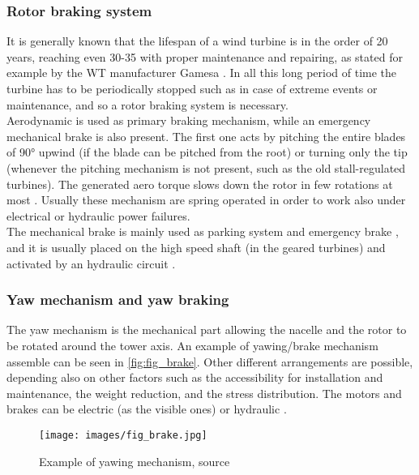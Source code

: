 \subsubsection{Rotor braking system}
It is generally known that the lifespan of a wind turbine is in the order of 20 years, reaching even 30-35 with proper maintenance and repairing, as stated for example by the WT manufacturer Gamesa \cite{gamesa_life_turbine}. In all this long period of time the turbine has to be periodically stopped such as in case of extreme events or maintenance, and so a rotor braking system is necessary.\\
Aerodynamic is used as primary braking mechanism, while an emergency mechanical brake is also present. The first one acts by pitching the entire blades of 90$\si{\degree}$ upwind (if the blade can be pitched from the root) or turning only the tip (whenever the pitching mechanism is not present, such as the old stall-regulated turbines). The generated aero torque slows down the rotor in few rotations at most \cite{brake_dromstorre}. Usually these mechanism are spring operated in order to work also under electrical or hydraulic power failures.\\
The mechanical brake is mainly used as parking system and emergency brake \cite{brake_dromstorre}, and it is usually placed on the high speed shaft (in the geared turbines) and activated by an hydraulic circuit \cite{brake_wiley}. 

\subsubsection{Yaw mechanism and yaw braking}
The yaw mechanism is the mechanical part allowing the nacelle and the rotor to be rotated around the tower axis. An example of yawing/brake mechanism assemble can be seen in \autoref{fig:fig_brake}. Other different arrangements are possible, depending also on other factors such as the accessibility for installation and maintenance, the weight reduction, and the stress distribution. The motors and brakes can be electric (as the visible ones) or hydraulic \cite{Kim_2014}.

\begin{figure}[htb]
  \centering
  \texttt{[image: images/fig\_brake.jpg]}
  \caption{Example of yawing mechanism, source \cite{Kim_2014}}
  \label{fig:fig_brake}
\end{figure}
